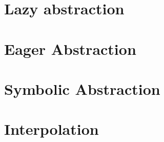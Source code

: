 

\section{Lazy abstraction}

\section{Eager Abstraction}

\section{Symbolic Abstraction}

\section{Interpolation}

